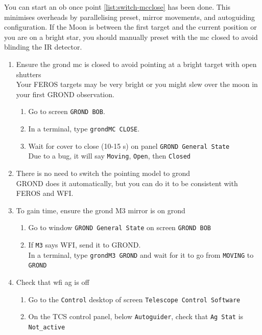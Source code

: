 \documentclass[11pt,fleqn,a4paper]{book}
\begin{document}
You can start an \gls{ob} once point \ref{list:switch-mcclose} has been done.  This minimises overheads by parallelising \gls{preset}, mirror movements, and autoguiding configuration.  If the Moon is between the first target and the current position or you are on a bright star, you should manually preset with the \gls{mc} closed to avoid blinding the IR detector.

\begin{enumerate}
  \item Ensure the \gls{grond} \gls{mc} is closed to avoid \gls{pointing} at a bright target with open shutters\\
        Your FEROS targets may be very bright or you might slew over the moon in your first GROND observation.\label{list:switch-mcclose}
  \begin{enumerate}
    \item Go to screen \texttt{GROND BOB}.
    \item In a terminal, type \texttt{\gls{grondMC} CLOSE}.
    \item Wait for cover to close (10-15 s) on panel \texttt{GROND \gls{General State}}\\
          Due to a bug, it will say \texttt{Moving}, \texttt{Open}, then \texttt{Closed}
  \end{enumerate}
  \item There is no need to switch the \gls{pointing model} to \gls{grond}\\
        GROND does it automatically, but you can do it to be consistent with FEROS and WFI.
  \item To gain time, ensure the \gls{grond} \gls{M3} mirror is on \gls{grond}
  \begin{enumerate}
    \item Go to window \texttt{GROND \gls{General State}} on screen \texttt{GROND BOB}
    \item If \texttt{\gls{M3}} says WFI\label{list:grond:checkm3}, send it to GROND.\\
            In a terminal, type \texttt{\gls{grondM3} GROND} and wait for it to go from \texttt{MOVING} to \texttt{GROND}
    \end{enumerate}
    \item Check that \gls{wfi} \gls{ag} is off 
    \begin{enumerate}
        \item Go to the \texttt{Control} \gls{desktop} of screen \texttt{Telescope Control Software}
        \item On the \gls{TCS control panel}, below \texttt{Autoguider}, check that \texttt{Ag Stat} is \texttt{Not\_active}

\end{enumerate}
\end{enumerate}
\end{document}
